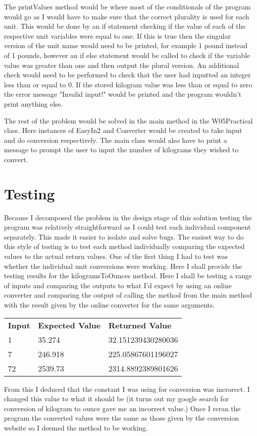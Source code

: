 \documentclass[a4paper]{article}
\begin{document}
The printValues method would be where most of the conditionals of the program would go as I would have to make sure that the correct plurality is used 
for each unit. This would be done by an if statement checking if the value of each of the respective unit variables were equal to one. If this is true 
then the singular version of the unit name would need to be printed, for example 1 pound instead of 1 pounds, however an if else statement would be 
called to check if the variable value was greater than one and then output the plural version. An additional check would need to be performed to check 
that the user had inputted an integer less than or equal to 0. If the stored kilogram value was less than or equal to zero the error message "Invalid 
input!" would be printed and the program wouldn't print anything else.

The rest of the problem would be solved in the main method in the W05Practical class. Here instances of EasyIn2 and Converter would be created to 
take input and do conversion respectively. The main class would also have to print a message to prompt the user to input the number of kilograms they 
wished to convert.

\section*{Testing}
Because I decomposed the problem in the design stage of this solution testing the program was relatively straightforward as I could test each 
individual component separately. This made it easier to isolate and solve bugs. The easiest way to do this style of testing is to test each method 
individually comparing the expected values to the actual return values. One of the first thing I had to test was whether the individual unit 
conversions were working. Here I shall provide the testing results for the kilogramsToOunces method. Here I shall be testing a range of inputs and 
comparing the outputs to what I'd expect by using an online converter and comparing the output of calling the method from the main method with the 
result given by the online converter for the same arguments.
\begin{table}[!h]
\begin{tabular}{lll}
\textbf{Input} & \textbf{Expected Value} & \textbf{Returned Value} \\
1              & 35.274                  & 32.151239430280036      \\
7              & 246.918                 & 225.05867601196027      \\
72             & 2539.73                 & 2314.8892389801626     
\end{tabular}
\end{table}
From this I deduced that the constant I was using for conversion was incrorect. I changed this value to what it should be (it turns out my google 
search for conversion of kilogram to ounce gave me an incorrect value.) Once I reran the program the converted values were the same as those given by 
the conversion website so I deemed the method to be working.
\end{document}
